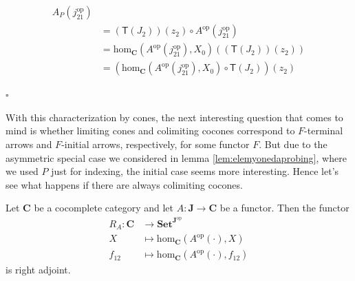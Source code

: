 \begin{prf}
\begin{enumerate}
\begin{align*}
  A_{P}(j_{21}^{\textrm{op}})
  \\
  &=
  (\mathsf{T}(J_{2}))(z_{2})
  \circ
  A^{\textrm{op}}(j_{21}^{\textrm{op}})
  \\
  &=
  \mathrm{hom}_{\mathbf{C}}
  \left(
    A^{\textrm{op}}(j_{21}^{\textrm{op}}),
    X_{0}
  \right)
  \left(
    (\mathsf{T}(J_{2}))(z_{2})
  \right)
  \\
  &=
  \left(
    \mathrm{hom}_{\mathbf{C}}
    \left(
      A^{\textrm{op}}(j_{21}^{\textrm{op}}),
      X_{0}
    \right)
    \circ
    \mathsf{T}(J_{2})
  \right)
  \left(
    z_{2}
  \right)
\end{align*}
\end{enumerate}
\phantom{proven}
\hfill
$\square$
\end{prf}
With this characterization by cones, the next interesting question that comes to mind is whether limiting cones and colimiting cocones correspond to $F$-terminal arrows and $F$-initial arrows, respectively, for some functor $F$.
But due to the asymmetric special case we considered in lemma \ref{lem:elemyonedaprobing}, where we used $P$ just for indexing, the initial case seems more interesting.
Hence let's see what happens if there are always colimiting cocones.
\\
\begin{thm}
\label{thm:initprobisinitcone}
Let $\mathbf{C}$ be a cocomplete category and let $A \colon \mathbf{J} \rightarrow \mathbf{C}$ be a functor.
Then the functor
\begin{align*}
  R_{A}
  \colon
  \mathbf{C}
  &\rightarrow
  \mathbf{Set}^{\mathbf{J}^{\textrm{op}}}
  \\
  X
  &\mapsto
  \mathrm{hom}_{\mathbf{C}}
  \left(
    A^{\textrm{op}}(\cdot),
    X
  \right)
  \\
  f_{12}
  &\mapsto
  \mathrm{hom}_{\mathbf{C}}
  \left(
    A^{\textrm{op}}(\cdot),
    f_{12}
  \right)
\end{align*}
is right adjoint.
\end{thm}
